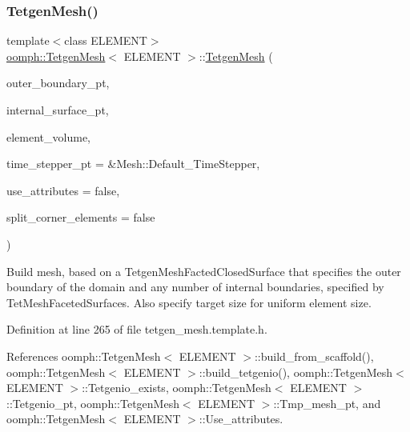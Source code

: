 \mbox{\label{classoomph_1_1TetgenMesh_afe49b6f5fc0ff75d8ddfbfab204d6f20}} 
\subsubsection{\texorpdfstring{Tetgen\+Mesh()}{TetgenMesh()}\hspace{0.1cm}{\footnotesize\ttfamily [6/6]}}
{\footnotesize\ttfamily template$<$class E\+L\+E\+M\+E\+NT$>$ \\
\hyperlink{classoomph_1_1TetgenMesh}{oomph\+::\+Tetgen\+Mesh}$<$ E\+L\+E\+M\+E\+NT $>$\+::\hyperlink{classoomph_1_1TetgenMesh}{Tetgen\+Mesh} (\begin{DoxyParamCaption}\item[{Tet\+Mesh\+Faceted\+Closed\+Surface $\ast$const \&}]{outer\+\_\+boundary\+\_\+pt,  }\item[{Vector$<$ Tet\+Mesh\+Faceted\+Surface $\ast$$>$ \&}]{internal\+\_\+surface\+\_\+pt,  }\item[{const double \&}]{element\+\_\+volume,  }\item[{Time\+Stepper $\ast$}]{time\+\_\+stepper\+\_\+pt = {\ttfamily \&Mesh\+:\+:Default\+\_\+TimeStepper},  }\item[{const bool \&}]{use\+\_\+attributes = {\ttfamily false},  }\item[{const bool \&}]{split\+\_\+corner\+\_\+elements = {\ttfamily false} }\end{DoxyParamCaption})\hspace{0.3cm}{\ttfamily [inline]}}



Build mesh, based on a Tetgen\+Mesh\+Facted\+Closed\+Surface that specifies the outer boundary of the domain and any number of internal boundaries, specified by Tet\+Mesh\+Faceted\+Surfaces. Also specify target size for uniform element size. 



Definition at line 265 of file tetgen\+\_\+mesh.\+template.\+h.



References oomph\+::\+Tetgen\+Mesh$<$ E\+L\+E\+M\+E\+N\+T $>$\+::build\+\_\+from\+\_\+scaffold(), oomph\+::\+Tetgen\+Mesh$<$ E\+L\+E\+M\+E\+N\+T $>$\+::build\+\_\+tetgenio(), oomph\+::\+Tetgen\+Mesh$<$ E\+L\+E\+M\+E\+N\+T $>$\+::\+Tetgenio\+\_\+exists, oomph\+::\+Tetgen\+Mesh$<$ E\+L\+E\+M\+E\+N\+T $>$\+::\+Tetgenio\+\_\+pt, oomph\+::\+Tetgen\+Mesh$<$ E\+L\+E\+M\+E\+N\+T $>$\+::\+Tmp\+\_\+mesh\+\_\+pt, and oomph\+::\+Tetgen\+Mesh$<$ E\+L\+E\+M\+E\+N\+T $>$\+::\+Use\+\_\+attributes.

